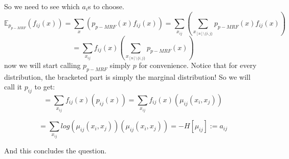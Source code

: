 \documentclass[11pt]{article}
\begin{document}
So we need to see which $a_i$s to choose. 
\begin{equation*}
\mathds{E}_{p_{p-MRF}}(f_{ij}(x)) = \sum_x(p_{p-MRF}(x)f_{ij}(x))=\sum_{x_{ij}}\left(\sum_{x_{[n]\setminus \{i,j\}}}p_{p-MRF}(x)f_{ij}(x)\right)
\end{equation*}
\begin{equation*}
=\sum_{x_{ij}}f_{ij}(x)\left(\sum_{x_{[n]\setminus \{i,j\}}}p_{p-MRF}(x)\right)
\end{equation*}
now we will start calling $p_{p-MRF}$ simply $p$ for convenience.
Notice that for every distribution, the bracketed part is simply the marginal distribution! So we will call it $p_{ij}$ to get:
\begin{equation*}
=\sum_{x_{ij}}f_{ij}(x)\left(p_{ij}(x)\right)=\sum_{x_{ij}}f_{ij}(x)\left(\mu_{ij}(x_i,x_j)\right)
\end{equation*}

\begin{equation*}
=\sum_{x_{ij}}log(\mu_{ij}(x_i,x_j))\left(\mu_{ij}(x_i,x_j)\right) = -H\left[\mu_{ij}\right]  := a_{ij}
\end{equation*}

And this concludes the question.
\end{document}
